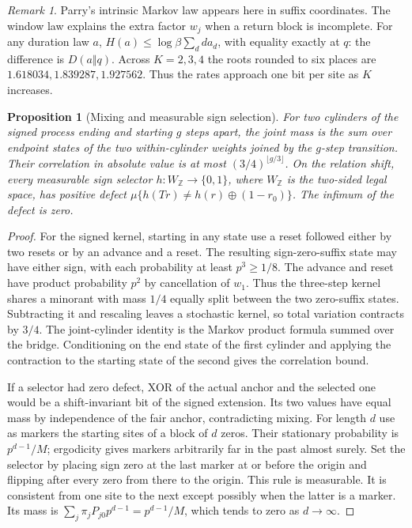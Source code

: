 \documentclass[11pt,reqno]{amsart}
\newtheorem{proposition}[theorem]{Proposition}
\theoremstyle{definition}
\theoremstyle{remark}
\newtheorem{remark}[theorem]{Remark}
\numberwithin{equation}{section}
\newcommand{\Z}{\mathbb{Z}}
\begin{document}
\begin{remark}\label{m9:parry-scope}
Parry's intrinsic Markov law \cite{m9:ParryMarkov} appears here in
suffix coordinates. The window law explains the extra factor \(w_j\)
when a return block is incomplete. For any duration law \(a\),
\(H(a)\le \log\beta\sum_d d a_d\), with equality exactly at \(q\):
the difference is \(D(a\Vert q)\). Across \(K=2,3,4\) the roots
rounded to six places are \(1.618034,1.839287,1.927562\).
Thus the rates approach one bit per site as \(K\) increases.
\end{remark}

\begin{proposition}[Mixing and measurable sign selection]\label{m9:sign}
For two cylinders of the signed process ending and starting
\(g\) steps apart, the joint mass is the sum over endpoint
states of the two within-cylinder weights joined by the
\(g\)-step transition. Their correlation in absolute value
is at most \((3/4)^{\lfloor g/3\rfloor}\).
On the relation shift, every measurable sign selector
\(h:W_{\Z}\to\{0,1\}\), where \(W_{\Z}\) is the two-sided legal
space, has positive defect
\(\mu\{h(Tr)\ne h(r)\oplus(1-r_0)\}\).
The infimum of the defect is zero.
\end{proposition}
\begin{proof}
For the signed kernel, starting in any state use a reset
followed either by two resets or by an advance and a reset.
The resulting sign-zero-suffix state may have either sign,
with each probability at least \(p^3\ge1/8\). The advance
and reset have product probability \(p^2\) by cancellation
of \(w_1\). Thus the three-step kernel shares a minorant
with mass \(1/4\) equally split between the two zero-suffix
states. Subtracting it and rescaling leaves a stochastic
kernel, so total variation contracts by \(3/4\).
The joint-cylinder identity is the Markov product formula
summed over the bridge. Conditioning on the end state of
the first cylinder and applying the contraction to the
starting state of the second gives the correlation bound.

If a selector had zero defect, XOR of the actual anchor and
the selected one would be a shift-invariant bit of the signed
extension. Its two values have equal mass by independence of
the fair anchor, contradicting mixing.
For length \(d\) use as markers the starting sites of a block
of \(d\) zeros. Their stationary probability is \(p^{d-1}/M\);
ergodicity gives markers arbitrarily far in the past almost
surely. Set the selector by placing sign zero at the last
marker at or before the origin and flipping after every zero
from there to the origin. This rule is measurable. It is
consistent from one site to the next except possibly when
the latter is a marker. Its mass is
\(\sum_j\pi_j P_{j0}p^{d-1}=p^{d-1}/M\), which tends to
zero as \(d\to\infty\).
\end{proof}
\end{document}
